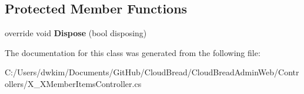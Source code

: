 \subsection*{Protected Member Functions}
\begin{DoxyCompactItemize}
\item 
override void {\bfseries Dispose} (bool disposing)\hypertarget{class_cloud_bread_admin_web_1_1_controllers_1_1_x___x_member_items_controller_a4073f601d8472a7cf91d18fafee1abb9}{}\label{class_cloud_bread_admin_web_1_1_controllers_1_1_x___x_member_items_controller_a4073f601d8472a7cf91d18fafee1abb9}

\end{DoxyCompactItemize}


The documentation for this class was generated from the following file\+:\begin{DoxyCompactItemize}
\item 
C\+:/\+Users/dwkim/\+Documents/\+Git\+Hub/\+Cloud\+Bread/\+Cloud\+Bread\+Admin\+Web/\+Controllers/X\+\_\+\+X\+Member\+Items\+Controller.\+cs\end{DoxyCompactItemize}
